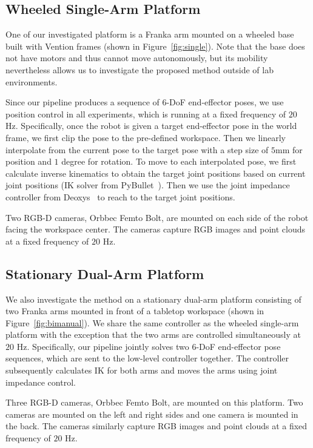 \subsection{Wheeled Single-Arm Platform}
One of our investigated platform is a Franka arm mounted on a wheeled base built with Vention frames (shown in Figure~\ref{fig:single}). Note that the base does not have motors and thus cannot move autonomously, but its mobility nevertheless allows us to investigate the proposed method outside of lab environments.

Since our pipeline produces a sequence of 6-DoF end-effector poses, we use position control in all experiments, which is running at a fixed frequency of $20$ Hz. Specifically, once the robot is given a target end-effector pose in the world frame, we first clip the pose to the pre-defined workspace. Then we linearly interpolate from the current pose to the target pose with a step size of $5$mm for position and $1$ degree for rotation. To move to each interpolated pose, we first calculate inverse kinematics to obtain the target joint positions based on current joint positions (IK solver from PyBullet~\cite{coumans2016pybullet}). Then we use the joint impedance controller from Deoxys~\cite{zhu2022viola} to reach to the target joint positions.

Two RGB-D cameras, Orbbec Femto Bolt, are mounted on each side of the robot facing the workspace center. The cameras capture RGB images and point clouds at a fixed frequency of $20$ Hz.

\subsection{Stationary Dual-Arm Platform}
We also investigate the method on a stationary dual-arm platform consisting of two Franka arms mounted in front of a tabletop workspace (shown in Figure~\ref{fig:bimanual}). We share the same controller as the wheeled single-arm platform with the exception that the two arms are controlled simultaneously at $20$ Hz. Specifically, our pipeline jointly solves two 6-DoF end-effector pose sequences, which are sent to the low-level controller together. The controller subsequently calculates IK for both arms and moves the arms using joint impedance control.

Three RGB-D cameras, Orbbec Femto Bolt, are mounted on this platform. Two cameras are mounted on the left and right sides and one camera is mounted in the back. The cameras similarly capture RGB images and point clouds at a fixed frequency of $20$ Hz.

